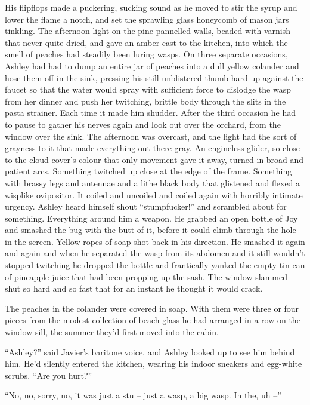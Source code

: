 \documentclass[
]{article}
\begin{document}
His flipflops made a puckering, sucking sound as he moved to stir the
syrup and lower the flame a notch, and set the sprawling glass honeycomb
of mason jars tinkling. The afternoon light on the pine-pannelled walls,
beaded with varnish that never quite dried, and gave an amber cast to
the kitchen, into which the smell of peaches had steadily been luring
wasps. On three separate occasions, Ashley had had to dump an entire jar
of peaches into a dull yellow colander and hose them off in the sink,
pressing his still-unblistered thumb hard up against the faucet so that
the water would spray with sufficient force to dislodge the wasp from
her dinner and push her twitching, brittle body through the slits in the
pasta strainer. Each time it made him shudder. After the third occasion
he had to pause to gather his nerves again and look out over the
orchard, from the window over the sink. The afternoon was overcast, and
the light had the sort of grayness to it that made everything out there
gray. An engineless glider, so close to the cloud cover's colour that
only movement gave it away, turned in broad and patient arcs. Something
twitched up close at the edge of the frame. Something with brassy legs
and antennae and a lithe black body that glistened and flexed a wisplike
ovipositor. It coiled and uncoiled and coiled again with horribly
intimate urgency. Ashley heard himself shout ``stumpfucker!'' and
scrambled about for something. Everything around him a weapon. He
grabbed an open bottle of Joy and smashed the bug with the butt of it,
before it could climb through the hole in the screen. Yellow ropes of
soap shot back in his direction. He smashed it again and again and when
he separated the wasp from its abdomen and it still wouldn't stopped
twitching he dropped the bottle and frantically yanked the empty tin can
of pineapple juice that had been propping up the sash. The window
slammed shut so hard and so fast that for an instant he thought it would
crack.

The peaches in the colander were covered in soap. With them were three
or four pieces from the modest collection of beach glass he had arranged
in a row on the window sill, the summer they'd first moved into the
cabin.

``Ashley?'' said Javier's baritone voice, and Ashley looked up to see
him behind him. He'd silently entered the kitchen, wearing his indoor
sneakers and egg-white scrubs. ``Are you hurt?''

``No, no, sorry, no, it was just a stu -- just a wasp, a big wasp. In
the, uh --''
\end{document}
